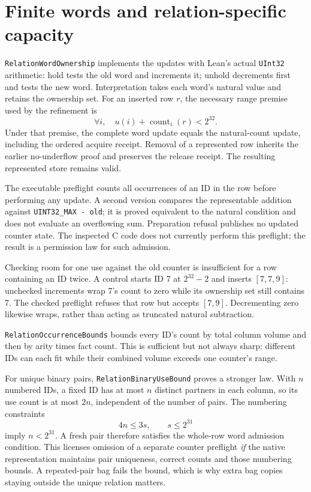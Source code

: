 \documentclass[11pt,a4paper]{article}
\newcommand{\code}[1]{\nolinkurl{#1}}
\begin{document}
\section{Finite words and relation-specific capacity}

\code{RelationWordOwnership} implements the updates with Lean's actual
\code{UInt32} arithmetic: hold tests the old word and increments it; unhold
decrements first and tests the new word. Interpretation takes each word's
natural value and retains the ownership set. For an inserted row $r$, the
necessary range premise used by the refinement is
\[
 \forall i,\quad u(i)+\operatorname{count}_i(r)<2^{32}.
\]
Under that premise, the complete word update equals the natural-count
update, including the ordered acquire receipt. Removal of a represented row
inherits the earlier no-underflow proof and preserves the release receipt.
The resulting represented store remains valid.

The executable preflight counts all occurrences of an ID in the row before
performing any update. A second version compares the representable addition
against \verb|UINT32_MAX - old|; it is proved equivalent to the natural
condition and does not evaluate an overflowing sum. Preparation refusal
publishes no updated counter state. The inspected C code does not currently
perform this preflight; the result is a permission law for such admission.

Checking room for one use against the old counter is insufficient for a
row containing an ID twice. A control starts ID 7 at $2^{32}-2$ and inserts
$[7,7,9]$: unchecked increments wrap 7's count to zero while its ownership
set still contains 7. The checked preflight refuses that row but accepts
$[7,9]$. Decrementing zero likewise wraps, rather than acting as truncated
natural subtraction.

\code{RelationOccurrenceBounds} bounds every ID's count by total column
volume and then by arity times fact count. This is sufficient but not always
sharp: different IDs can each fit while their combined volume exceeds one
counter's range.

For unique binary pairs, \code{RelationBinaryUseBound} proves a stronger law.
With $n$ numbered IDs, a fixed ID has at most $n$ distinct partners in each
column, so its use count is at most $2n$, independent of the number of pairs.
The numbering constraints
\[
 4n\leq3s,\qquad s\leq2^{31}
\]
imply $n<2^{31}$. A fresh pair therefore satisfies the whole-row word
admission condition. This licenses omission of a separate counter preflight
\emph{if} the native representation maintains pair uniqueness, correct counts
and those numbering bounds. A repeated-pair bag fails the bound, which is
why extra bag copies staying outside the unique relation matters.
\end{document}
